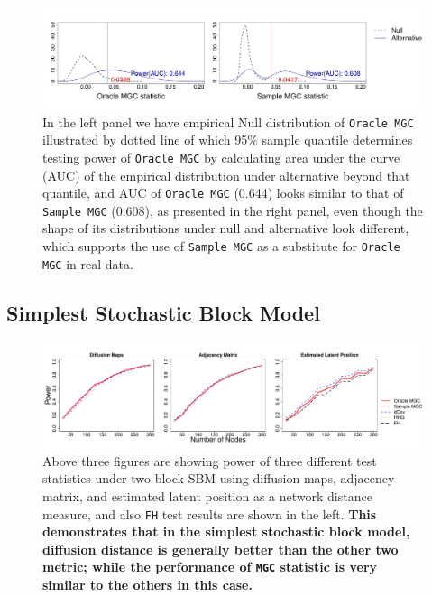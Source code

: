\documentclass[12pt]{article}
\begin{document}
\begin{figure}[H]
	\centering
	\includegraphics[width=6in]{../Figure/density.pdf}
	\caption{In the left panel we have empirical Null distribution of \texttt{Oracle MGC} illustrated by dotted line of which 95$\%$ sample quantile determines testing power of \texttt{Oracle MGC} by calculating area under the curve (AUC) of the empirical distribution under alternative beyond that quantile, and AUC of \texttt{Oracle MGC} (0.644) looks similar to that of \texttt{Sample MGC} (0.608), as presented in the right panel, even though the shape of its distributions under null and alternative look different, which supports the use of \texttt{Sample MGC} as a substitute for \texttt{Oracle MGC} in real data.}
	\label{fig:density}
\end{figure}	
 
 \newpage
\subsection*{Simplest Stochastic Block Model}
 
\begin{figure}[h]
	\centering
	\includegraphics[width=\linewidth]{../Figure/twoSBM.pdf}
	\caption{Above three figures are showing power of three different test statistics under two block SBM using diffusion maps, adjacency matrix, and estimated latent position as a network distance measure, and also \texttt{FH} test results are shown in the left. \textbf{This demonstrates that in the simplest stochastic block model, diffusion distance is generally better than the other two metric; while the performance of \texttt{MGC} statistic is very similar to the others in this case.}}
	\label{fig:twoSBM}
\end{figure}
\end{document}
